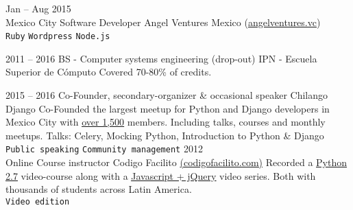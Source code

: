 \documentclass[9pt]{developercv} %
\begin{document}
\begin{entrylist}
    \entry
        {
            Jan -- Aug 2015
            \\\footnotesize{Mexico City}
        }
        {Software Developer}
        {Angel Ventures Mexico ({\href{http://www.angelventures.vc/}{\underline{angelventures.vc}}})}
        {
            \lorem \lorem \lorem\\
            \texttt{Ruby}
            \slashsep\texttt{Wordpress}
            \slashsep\texttt{Node.js}
        }

\end{entrylist}



\begin{entrylist}
    \entry
        {2011 -- 2016}
        {BS - Computer systems engineering (drop-out)}
        {IPN - Escuela Superior de Cómputo}
        {Covered 70-80\% of credits.}
\end{entrylist}


\begin{entrylist}
    \entry
        {2015 -- 2016}
        {Co-Founder, secondary-organizer \& occasional speaker}
        {Chilango Django}
        {
            Co-Founded the largest meetup for Python and Django developers in Mexico
            City with
            {\href{https://meetup.com/Chilango-Django/}{\underline{over 1,500}}}
            members. Including talks, courses and monthly meetups. \small{Talks: Celery, Mocking \w Python, Introduction to Python \& Django} \\
            \texttt{Public speaking}\slashsep
            \texttt{Community management}
        }
    \entry
        {2012\\\footnotesize{Online}}
        {Course instructor}
        {Codigo Facilito {\href{(https://codigofacilito.com/}{(codigofacilito.com)}}}
        {Recorded a {\href{https://www.youtube.com/watch?v=CjmzDHMHxwU&list=PLE549A038CF82905F}{\underline{Python 2.7}}} video-course along with a {\href{https://www.youtube.com/watch?v=jKbjblt4NXA&list=PLpOqH6AE0tNi47LF-_6gddgq10lp_TLDB}{\underline{Javascript + jQuery}}}
        video series. Both with thousands of students across Latin America.\\
                \texttt{Video edition}
        }
\end{entrylist}
\end{document}

